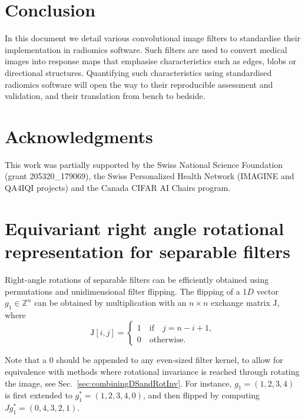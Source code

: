 \documentclass[fleqn,a4paper,oneside,openany]{book}
\begin{document}
\begin{minipage}[l]{0.45\textwidth}

\end{minipage}
\quad
\begin{minipage}[r]{0.45\textwidth}

\end{minipage}
\FloatBarrier

\chapter{Conclusion}
In this document we detail various convolutional image filters to standardise their implementation in radiomics software. Such filters are used to convert medical images into response maps that emphasise characteristics such as edges, blobs or directional structures. Quantifying such characteristics using standardised radiomics software will open the way to their reproducible assessment and validation, and their translation from bench to bedside.

\chapter*{Acknowledgments}
This work was partially supported by the Swiss National Science Foundation (grant 205320\_179069), the Swiss Personalized Health Network (IMAGINE and QA4IQI projects) and the Canada CIFAR AI Chairs program.



\appendix
\chapter{Equivariant right angle rotational representation for separable filters} \label{app:separableConvRightAngleEquivariant}
Right-angle rotations of separable filters can be efficiently obtained using permutations and unidimensional filter flipping.
The flipping of a 1$D$ vector $g_1 \in \mathbb{Z}^n$ can be obtained by multiplication with an $n\times n$ exchange matrix $\mathrm{J}$, where 
$$\mathrm{J}[i,j] = \begin{cases}
1\quad \text{if}\quad j=n-i+1,\\
0\quad \text{otherwise}.
\end{cases}$$

Note that a $0$ should be appended to any even-sized filter kernel, to allow for equivalence with methods where rotational invariance is reached through rotating the image, see Sec.~\ref{sec:combiningDSandRotInv}. For instance, $g_1 = (1,2,3,4)$ is first extended to $g_1^{*}=(1,2,3,4,0)$, and then flipped by computing $Jg_1^{*}=(0,4,3,2,1)$.
\end{document}
